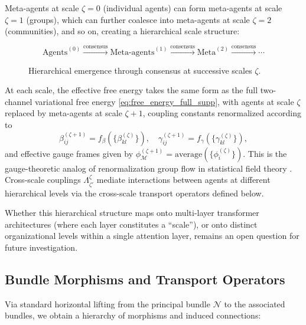 \documentclass[twoside,11pt]{article}
\begin{document}
Meta-agents at scale $\zeta=0$ (individual agents) can form meta-agents at scale $\zeta=1$ (groups), which can further coalesce into meta-agents at scale $\zeta=2$ (communities), and so on, creating a hierarchical scale structure:

\begin{figure}[h]
\centering
\small
\[
\text{Agents}^{(0)} \xrightarrow{\text{consensus}}
\text{Meta-agents}^{(1)} \xrightarrow{\text{consensus}}
\text{Meta}^{(2)} \xrightarrow{\text{consensus}} \cdots
\]
\caption{Hierarchical emergence through consensus at successive scales $\zeta$.}
\label{fig:hierarchy}
\end{figure}

At each scale, the effective free energy takes the same form as the full two-channel variational free energy \eqref{eq:free_energy_full_supp}, with agents at scale $\zeta$ replaced by meta-agents at scale $\zeta+1$, coupling constants renormalized according to
\begin{equation*}
  \beta_{ij}^{(\zeta+1)} = f_\beta(\{\beta_{kl}^{(\zeta)}\}), \quad
  \gamma_{ij}^{(\zeta+1)} = f_\gamma(\{\gamma_{kl}^{(\zeta)}\}),
\end{equation*}
and effective gauge frames given by $\phi_{\mathcal{M}}^{(\zeta+1)} = \text{average}(\{\phi_i^{(\zeta)}\})$.
This is the gauge-theoretic analog of renormalization group flow in statistical field theory \citep{anderson1984basic,wilson1974renormalization,garciaperez2018multiscale}. Cross-scale couplings $\Lambda^{\zeta}_{\zeta'}$ mediate interactions between agents at different hierarchical levels via the cross-scale transport operators defined below.

Whether this hierarchical structure maps onto multi-layer transformer architectures (where each layer constitutes a ``scale''), or onto distinct organizational levels within a single attention layer, remains an open question for future investigation.

\subsection{Bundle Morphisms and Transport Operators}
Via standard horizontal lifting from the principal bundle $\mathcal{N}$ to the associated bundles, we obtain a hierarchy of morphisms and induced connections:
\end{document}
